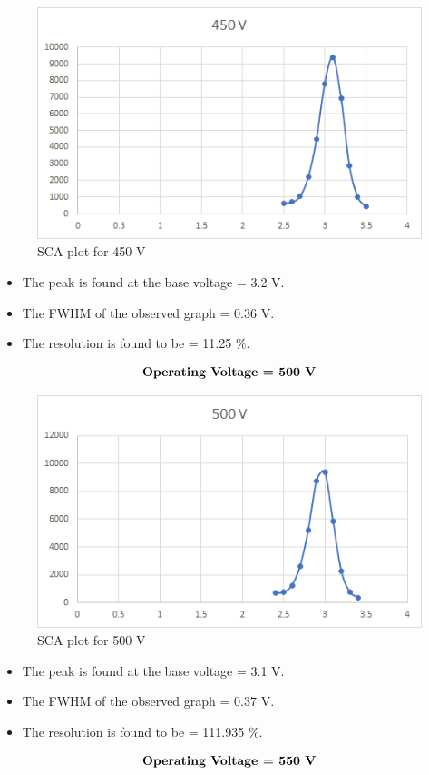 \documentclass[%
 reprint,
nofootinbib,
 amsmath,amssymb,
 aps,
floatfix,
]{revtex4-2}
\begin{document}
\begin{figure}[H]
    \centering
    \includegraphics[width = 8 cm]{Figures/450.png}
    \caption{SCA plot for 450 V}
    \label{fig:my_label}
\end{figure}
\begin{itemize}
    \item The peak is found at the base voltage = 3.2 V.
    \item The FWHM of the observed graph = 0.36 V.
    \item The resolution is found to be = 11.25 \%.
\end{itemize}
\begin{align*}
    \centering \textbf{Operating Voltage = 500 V}
\end{align*}



\begin{figure}[H]
    \centering
    \includegraphics[width = 8 cm]{Figures/500.png}
    \caption{SCA plot for 500 V}
    \label{fig:my_label}
\end{figure}

\begin{itemize}
    \item The peak is found at the base voltage = 3.1 V.
    \item The FWHM of the observed graph = 0.37 V.
    \item The resolution is found to be = 111.935 \%.
\end{itemize}
\begin{align*}
    \centering \textbf{Operating Voltage = 550 V}
\end{align*}
\end{document}
